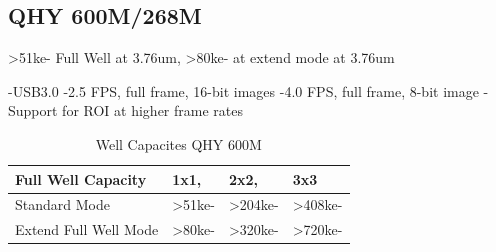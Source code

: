 \subsection{QHY 600M/268M}
>51ke- Full Well at 3.76um, >80ke- at extend mode at 3.76um

-USB3.0
-2.5 FPS, full frame, 16-bit images
-4.0 FPS, full frame, 8-bit image
-Support for ROI at higher frame rates


\begin{table}[h!]
\centering
\begin{tabular}{| l | l | l | l |}
\hline
Full Well Capacity      &  1x1, &   2x2,  &    3x3    \\ 
\hline
Standard Mode           &  >51ke-&  >204ke-&  >408ke-    \\ 
Extend Full Well Mode   &  >80ke- & >320ke-&  >720ke-    \\ 
\hline
\end{tabular}
\caption[TOC]{Well Capacites QHY 600M}
\label{table:WellCapacitesQHY600M}
\end{table}











%

